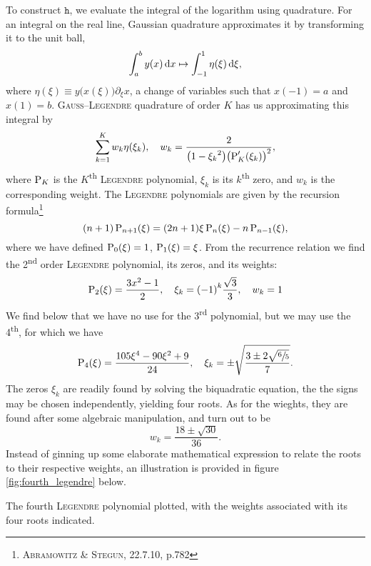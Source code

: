 To construct $\mathtt{h}$, we evaluate the integral of the logarithm using quadrature.
For an integral on the real line, Gaussian quadrature approximates it by transforming it to the unit ball,
\[
\int_{a}^{b} y(x) \,\mathrm{d} x \mapsto \int_{-1}^{1} \eta(\xi) \,\mathrm{d}\xi,
\]
where $\eta(\xi) \equiv y\big( x(\xi) \big) \partial_{\xi}x$, a change of variables such that $x(-1) = a$ and $x(1) = b$.
\textsc{Gauss}--\textsc{Legendre} quadrature of order $K$ has us approximating this integral by
\[
\sum_{k = 1}^{K} w_k \eta(\xi_k), \quad w_k = \frac{2}{\big( 1 - {\xi_k}^2 \big) {\big( {\operatorname{P}_K^{\prime}(\xi_k)} \big)}^2},
\]
where $\operatorname{P}_K$ is the $K$\textsuperscript{th} \textsc{Legendre} polynomial, $\xi_k$ is its $k$\textsuperscript{th} zero, and $w_k$ is the corresponding weight.
The \textsc{Legendre} polynomials are given by the recursion formula\footnote{\cite{abramowitz1965handbook} \textsc{Abramowitz} \& \textsc{Stegun}, 22.7.10, p.782}
\[
(n + 1) \operatorname{P}_{n+1}(\xi) = (2n + 1) \xi \operatorname{P}_{n}(\xi) - n\operatorname{P}_{n-1}(\xi),
\]
where we have defined $\operatorname{P}_0(\xi) = 1$, $\operatorname{P}_1(\xi) = \xi$.
From the recurrence relation we find the 2\textsuperscript{nd} order \textsc{Legendre} polynomial, its zeros, and its weights:
\[
\operatorname{P}_2(\xi) = \frac{3x^2 - 1}{2}, \quad \xi_k = {(-1)}^k \frac{\sqrt{3}}{3}, \quad w_k = 1
\]
We find below that we have no use for the 3\textsuperscript{rd} polynomial, but we may use the 4\textsuperscript{th}, for which we have
\[
\operatorname{P}_4(\xi) = \frac{105\xi^4 - 90\xi^2 + 9}{24}, \quad \xi_k = \pm\sqrt{\frac{3 \pm 2\sqrt{\sfrac{6}{5}}}{7}}.
\]
The zeros $\xi_k$ are readily found by solving the biquadratic equation, the the signs may be chosen independently, yielding four roots.
As for the wieghts, they are found after some algebraic manipulation, and turn out to be
\[
w_k = \frac{18 \pm \sqrt{30}}{36}.
\]
Instead of ginning up some elaborate mathematical expression to relate the roots to their respective weights, an illustration is provided in figure \ref{fig:fourth_legendre} below.
\begin{Figure}
  \centering
  \scalebox{1}{}
  \captionsetup{type = figure}
  \caption{The fourth \textsc{Legendre} polynomial plotted, with the weights associated with its four roots indicated.}
  \label{fig:fourth_legendre}
\end{Figure}

